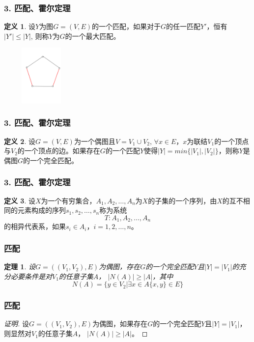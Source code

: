 \documentclass{beamer}
\newtheorem{Thm}{定理}[section]
\theoremstyle{definition}
\newtheorem{Def}{定义}[section]
\theoremstyle{example}
\begin{document}
\begin{CJK}{UTF8}{gbsn}
\begin{frame}
  \frametitle{3. 匹配、霍尔定理}

    \begin{Def}
   设$Y$为图$G=(V,E)$的一个匹配，如果对于$G$的任一匹配$Y'$，恒有$|Y'|\leq |Y|$, 则称$Y$为$G$的一个\alert{最大匹配}。
  \end{Def}
\pause
\centering
\includegraphics[width=4cm,height=3cm]{maximum}

\end{frame}
\begin{frame}
  \frametitle{3. 匹配、霍尔定理}

  \begin{Def}
    设$G=(V,E)$为一个偶图且$V=V_1\cup V_2$,
    $\forall x \in
    E$，$x$为联结$V_1$的一个顶点与$V_2$的一个顶点的边。如果存在$G$的一个匹配$Y$使得$|Y|=min\{|V_1|,|V_2|\}$，则称$Y$是偶图$G$的一个\alert{完全匹配}。
  \end{Def}

\end{frame}


\begin{frame}
  \frametitle{3. 匹配、霍尔定理}

  \begin{Def}
    设$X$为一个有穷集合，$A_1,A_2,\ldots,A_n$为$X$的子集的一个序列，由$X$的互不相同的元素构成的序列$s_1,s_2,\ldots,s_n$称为系统\[T:A_1,A_2,\ldots,A_n\]的\alert{相异代表系}，如果$s_i\in A_i$，$i=1,2,\ldots,n$。
  \end{Def}

\end{frame}
\begin{frame}
  \frametitle{匹配}
  \begin{Thm}
    设$G=((V_1,V_2),E)$为偶图，存在$G$的一个完全匹配$Y$且$|Y| = |V_1|$的充分必要条件是对$V_1$的任意子集$A$， $|N(A)| \geq |A|$，其中\[N(A) = \{y\in V_2|\exists x \in A \{x,y\} \in E\}\]
  \end{Thm}

\end{frame}

\begin{frame}
  \frametitle{匹配}
  \begin{proof}[证明]
\justifying\let\raggedright\justifying
设$G=((V_1,V_2),E)$为偶图，如果存在$G$的一个完全匹配$Y$且$|Y| = |V_1|$，则显然对$V_1$的任意子集$A$， $|N(A)| \geq |A|$。


\end{proof}
\end{frame}
\end{CJK}
\end{document}
